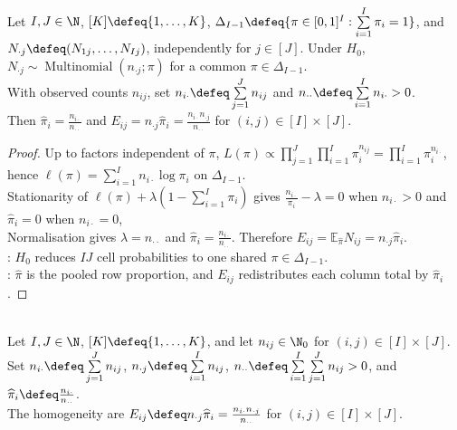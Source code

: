 \begin{proposition} \label{prop:homogeneity-common-multinomial-mle} \\
Let $I,J\in\N$, $[K]\defeq\{1,\ldots,K\}$, $\Delta_{I-1}\defeq\{\pi\in[0,1]^I:\sum\limits_{i=1}^{I}\pi_i=1\}$, and $N_{\cdot j}\defeq(N_{1j},\ldots,N_{Ij})$, independently for $j\in[J]$. Under $H_0$, $N_{\cdot j}\sim\operatorname{Multinomial}(n_{\cdot j};\pi)$ for a common $\pi\in\Delta_{I-1}$.\\
With observed counts $n_{ij}$, set $n_{i\cdot}\defeq\sum\limits_{j=1}^{J}n_{ij}$ and $n_{\cdot\cdot}\defeq\sum\limits_{i=1}^{I}n_{i\cdot}>0$.\\
Then $\widehat{\pi}_i=\frac{n_{i\cdot}}{n_{\cdot\cdot}}$ and $E_{ij}=n_{\cdot j}\widehat{\pi}_i=\frac{n_{i\cdot}n_{\cdot j}}{n_{\cdot\cdot}}$ for $(i,j)\in[I]\times[J]$.
\begin{proof}
Up to factors independent of $\pi$, $L(\pi)\propto\prod\limits_{j=1}^{J}\prod\limits_{i=1}^{I}\pi_i^{n_{ij}}=\prod\limits_{i=1}^{I}\pi_i^{n_{i\cdot}}$, hence $\ell(\pi)=\sum\limits_{i=1}^{I}n_{i\cdot}\log\pi_i$ on $\Delta_{I-1}$.\\
Stationarity of $\ell(\pi)+\lambda(1-\sum\limits_{i=1}^{I}\pi_i)$ gives $\frac{n_{i\cdot}}{\pi_i}-\lambda=0$ when $n_{i\cdot}>0$ and $\widehat{\pi}_i=0$ when $n_{i\cdot}=0$,\\
Normalisation gives $\lambda=n_{\cdot\cdot}$ and $\widehat{\pi}_i=\frac{n_{i\cdot}}{n_{\cdot\cdot}}$. Therefore $E_{ij}=\mathbb{E}_{\widehat{\pi}}N_{ij}=n_{\cdot j}\widehat{\pi}_i$.\\
: $H_0$ reduces $IJ$ cell probabilities to one shared $\pi\in\Delta_{I-1}$.\\
: $\widehat{\pi}$ is the pooled row proportion, and $E_{ij}$ redistributes each column total by $\widehat{\pi}_i$.
\end{proof}
\end{proposition}

\begin{definition} \label{def:homogeneity-fitted-counts} \\
Let $I,J\in\N$, $[K]\defeq\{1,\ldots,K\}$, and let $n_{ij}\in\N_0$ for $(i,j)\in[I]\times[J]$.\\
Set $n_{i\cdot}\defeq\sum\limits_{j=1}^{J}n_{ij}$, $n_{\cdot j}\defeq\sum\limits_{i=1}^{I}n_{ij}$, $n_{\cdot\cdot}\defeq\sum\limits_{i=1}^{I}\sum\limits_{j=1}^{J}n_{ij}>0$, and $\widehat{\pi}_i\defeq\frac{n_{i\cdot}}{n_{\cdot\cdot}}$.\\
The homogeneity  are $E_{ij}\defeq n_{\cdot j}\widehat{\pi}_i=\frac{n_{i\cdot}n_{\cdot j}}{n_{\cdot\cdot}}$ for $(i,j)\in[I]\times[J]$.
\end{definition}


